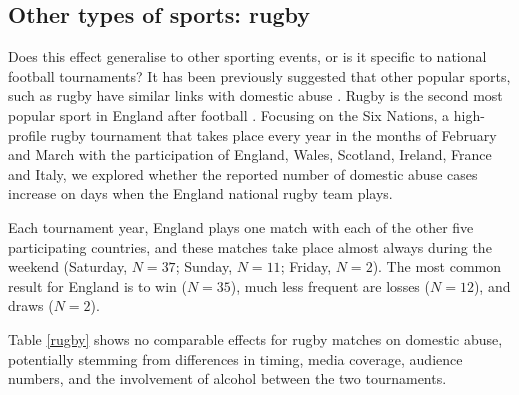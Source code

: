 \documentclass[12pt, a4paper]{article}
\begin{document}
\subsection{Other types of sports: rugby}
Does this effect generalise to other sporting events, or is it specific to national football tournaments? It has been previously suggested that other popular sports, such as rugby have similar links with domestic abuse \cite{Brooks-Hay2018}. Rugby is the second most popular sport in England after football \cite{Ipsos2003}. Focusing on the Six Nations, a high-profile rugby tournament that takes place every year in the months of February and March with the participation of England, Wales, Scotland, Ireland, France and Italy, we explored whether the reported number of domestic abuse cases increase on days when the England national rugby team plays. 

Each tournament year, England plays one match with each of the other five participating countries, and these matches take place almost always during the weekend (Saturday, $N = 37$; Sunday, $N = 11$; Friday, $N = 2$). The most common result for England is to win ($N = 35$), much less frequent are losses ($N = 12$), and draws ($N = 2$).


Table \ref{rugby} shows no comparable effects for rugby matches on domestic abuse, potentially stemming from differences in timing, media coverage, audience numbers, and the involvement of alcohol between the two tournaments.
\end{document}

